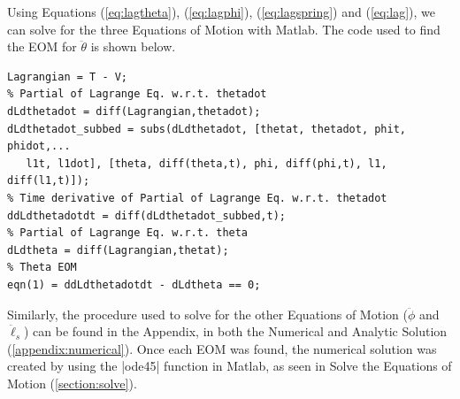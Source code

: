 \documentclass[12pt]{report}
\begin{document}
\begin{flushleft}
Using Equations (\ref{eq:lagtheta}), (\ref{eq:lagphi}), (\ref{eq:lagspring}) and (\ref{eq:lag}), we can
solve for the three Equations of Motion with Matlab. The code used to find the EOM
for $\ddot{\theta}$ is shown below.

\begin{lstlisting}[frame=lines,style=Matlab-editor,basicstyle = \mlttfamily]
Lagrangian = T - V;
% Partial of Lagrange Eq. w.r.t. thetadot
dLdthetadot = diff(Lagrangian,thetadot);
dLdthetadot_subbed = subs(dLdthetadot, [thetat, thetadot, phit, phidot,...
   l1t, l1dot], [theta, diff(theta,t), phi, diff(phi,t), l1, diff(l1,t)]);
% Time derivative of Partial of Lagrange Eq. w.r.t. thetadot
ddLdthetadotdt = diff(dLdthetadot_subbed,t);
% Partial of Lagrange Eq. w.r.t. theta
dLdtheta = diff(Lagrangian,thetat);
% Theta EOM
eqn(1) = ddLdthetadotdt - dLdtheta == 0;
\end{lstlisting}
Similarly, the procedure used to solve for the other Equations of Motion ($\ddot{\phi}$ and $\ddot{\ell}_s$) can be found in the Appendix, in both the Numerical and Analytic Solution (\ref{appendix:numerical}). Once each EOM was found, the numerical solution was created by using the |ode45| function in Matlab, as seen in Solve the Equations of Motion (\ref{section:solve}).

\end{flushleft}
\end{document}

